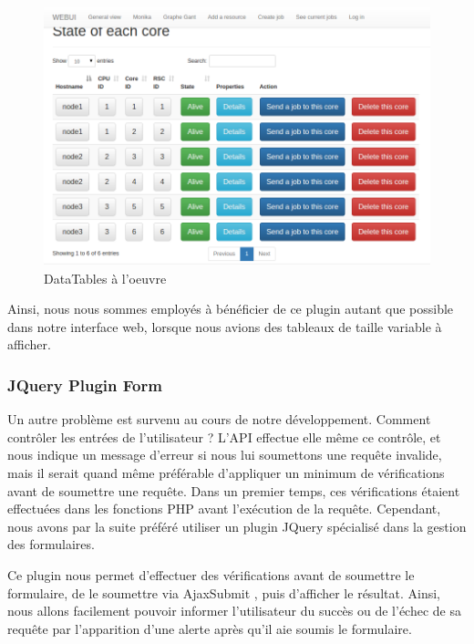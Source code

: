 \documentclass[a4paper,10pt]{article}
\begin{document}
\begin{figure}[h]
  \begin{center}
    \includegraphics[scale=0.38]{./all.png}
   \caption{\label{all} DataTables à l'oeuvre}
  \end{center}
\end{figure}

Ainsi, nous nous sommes employés à bénéficier de ce plugin autant que possible dans notre interface web, lorsque nous avions des tableaux de taille variable à afficher.
\subsubsection{JQuery Plugin Form}
Un autre problème est survenu au cours de notre développement. Comment contrôler les entrées de l'utilisateur ? L'API effectue elle même ce contrôle, et nous indique un message d'erreur si nous lui soumettons
une requête invalide, mais il serait quand même préférable d'appliquer un minimum de vérifications avant de soumettre une requête. Dans un premier temps, ces vérifications étaient effectuées dans les fonctions PHP
avant l'exécution de la requête. Cependant, nous avons par la suite préféré utiliser un plugin JQuery spécialisé dans la gestion des formulaires.

Ce plugin nous permet d'effectuer des vérifications avant de soumettre le formulaire, de le soumettre via AjaxSubmit , puis d'afficher le résultat. Ainsi, nous allons facilement pouvoir informer
l'utilisateur du succès ou de l'échec de sa requête par l'apparition d'une alerte après qu'il aie soumis le formulaire.
\end{document}
